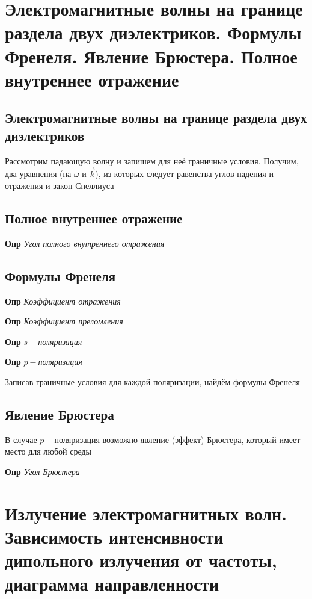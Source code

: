 \documentclass[a4paper, 14pt]{article}
\begin{document}
    \section{Электромагнитные волны на границе раздела двух диэлектриков.
    Формулы Френеля.
    Явление Брюстера.
    Полное внутреннее отражение}
    
    \subsection{Электромагнитные волны на границе раздела двух диэлектриков}
    
    Рассмотрим падающую волну и запишем для неё граничные условия.
    Получим, два уравнения (на $\omega$ и $\overrightarrow{k}$), из которых следует равенства углов падения и
    отражения и закон Снеллиуса
    
    \subsection{Полное внутреннее отражение}
    
    \textbf{Опр} \textit{Угол полного внутреннего отражения}
    
    \subsection{Формулы Френеля}
    
    \textbf{Опр} \textit{Коэффициент отражения}
    
    \textbf{Опр} \textit{Коэффициент преломления}
    
    \textbf{Опр} \textit{$s-$поляризация}
    
    \textbf{Опр} \textit{$p-$поляризация}
    
    Записав граничные условия для каждой поляризации, найдём формулы Френеля
    
    \subsection{Явление Брюстера}
    
    В случае $p-$поляризация возможно явление (эффект) Брюстера, который имеет место для любой среды
    
    \textbf{Опр} \textit{Угол Брюстера}
    
    \section{Излучение электромагнитных волн.
    Зависимость интенсивности дипольного излучения от частоты, диаграмма направленности}
    
\end{document}
